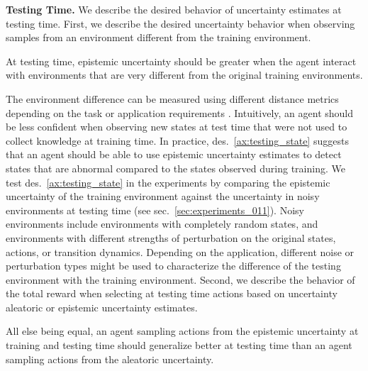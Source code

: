 \textbf{Testing Time.} We describe the desired behavior of uncertainty estimates at testing time. First, we describe the desired uncertainty behavior when observing samples from an environment different from the training environment.
\begin{desiderata}
    \label{ax:testing_state}
    At testing time, epistemic uncertainty should be greater when the agent interact with environments that are very different from the original training environments.
\end{desiderata}
\vspace{-2mm}
The environment difference can be measured using different distance metrics depending on the task or application requirements \citep{domain-shifts-rl}. Intuitively, an agent should be less confident when observing new states at test time that were not used to collect knowledge at training time. In practice, des.~\ref{ax:testing_state} suggests that an agent should be able to use epistemic uncertainty estimates to detect states that are abnormal compared to the states observed during training. We test des.~\ref{ax:testing_state} in the experiments by comparing the epistemic uncertainty of the training environment against the uncertainty in noisy environments at testing time (see sec.~\ref{sec:experiments_011}). Noisy environments include environments with completely random states, and environments with different strengths of perturbation on the original states, actions, or transition dynamics. Depending on the application, different noise or perturbation types might be used to characterize the difference of the testing environment with the training environment. Second, we describe the behavior of the total reward when selecting at testing time actions based on uncertainty aleatoric or epistemic uncertainty estimates.
\begin{desiderata}
    \label{ax:testing_strategy}
    All else being equal, an agent sampling actions from the epistemic uncertainty at training and testing time should generalize better at testing time than an agent sampling actions from the aleatoric uncertainty.
\end{desiderata}
\vspace{-2mm}

